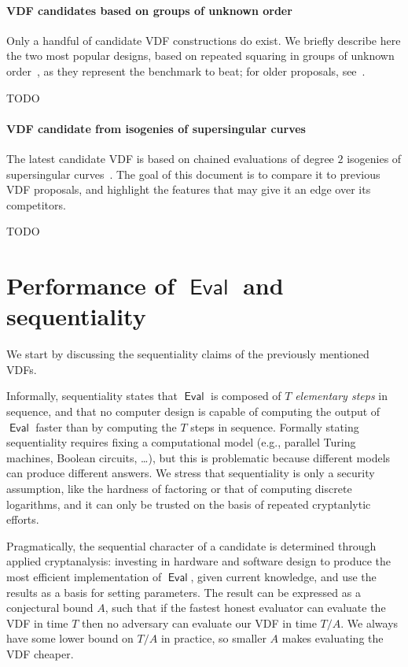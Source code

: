 \documentclass{article}
\DeclareMathOperator{\Eval}{\mathsf{Eval}}
\begin{document}
\paragraph{VDF candidates based on groups of unknown order}
Only a handful of candidate VDF constructions do exist. %
We briefly describe here the two most popular designs, based on
repeated squaring in groups of unknown
order~\cite{Wesolowski,Pietrzak}, as they represent the benchmark to
beat; for older proposals, see~\cite{Boneh}.

TODO

\paragraph{VDF candidate from isogenies of supersingular curves}
The latest candidate VDF is based on chained evaluations of degree $2$
isogenies of supersingular curves~\cite{cryptoeprint:2019:166}. %
The goal of this document is to compare it to previous VDF proposals,
and highlight the features that may give it an edge over its
competitors.

TODO



\section{Performance of $\Eval$ and sequentiality}
\label{sec:performance}

We start by discussing the sequentiality claims of the previously
mentioned VDFs. %

Informally, sequentiality states that $\Eval$ is composed of $T$
\emph{elementary steps} in sequence, and that no computer design is
capable of computing the output of $\Eval$ faster than by computing
the $T$ steps in sequence. %
Formally stating sequentiality requires fixing a computational model
(e.g., parallel Turing machines, Boolean circuits, \dots), but this is
problematic because different models can produce different answers. %
We stress that sequentiality is only a security assumption, like the
hardness of factoring or that of computing discrete logarithms, and it
can only be trusted on the basis of repeated cryptanlytic efforts.

Pragmatically, the sequential character of a candidate is determined
through applied cryptanalysis: investing in hardware and software
design to produce the most efficient implementation of $\Eval$, given
current knowledge, and use the results as a basis for setting
parameters. %
The result can be expressed as a conjectural bound $A$, such that if
the fastest honest evaluator can evaluate the VDF in time $T$ then no
adversary can evaluate our VDF in time $T/A$.  We always have some
lower bound on $T/A$ in practice, so smaller $A$ makes evaluating the
VDF cheaper.
\end{document}
